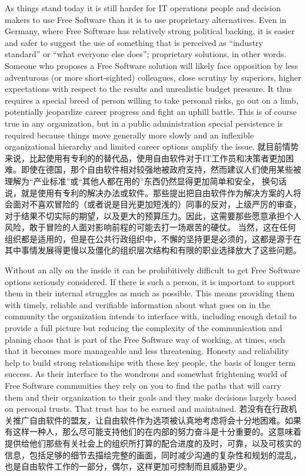 As things stand today it is still harder for IT operations people and decision
makers to use Free Software than it is to use proprietary alternatives. Even in
Germany, where Free Software has relatively strong political backing, it is
easier and safer to suggest the use of something that is perceived as ``industry
standard'' or ``what everyone else does''; proprietary solutions, in other words.
Someone who proposes a Free Software solution will likely face opposition by
less adventurous (or more short-sighted) colleagues, close scrutiny by
superiors, higher expectations with respect to the results and unrealistic
budget pressure. It thus requires a special breed of person willing to take
personal risks, go out on a limb, potentially jeopardize career progress and
fight an uphill battle. This is of course true in any organization, but in a
public administration special persistence is required because things move
generally more slowly and an inflexible organizational hierarchy and limited
career options amplify the issue.
就目前情势来说，比起使用有专利的的替代品，使用自由软件对于IT工作员和决策者更加困难。即使在德国，那个自由软件相对较强地被政府支持，然而建议人们使用某些被理解为“产业标准”或“其他人都在用的”东西仍然显得更加简单和安全，
换句话说，就是使用有专利的解决办法或软件。那些提出把自由软件作为解决方案的人将会面对不喜欢冒险的（或者说是目光更加短浅的）同事的反对，上级严厉的审查，对于结果不切实际的期望，以及更大的预算压力。因此，这需要那些愿意承担个人风险，敢于冒险的人面对影响前程的可能去打一场艰苦的硬仗。
当然，这在任何组织都是适用的，但是在公共行政组织中，不懈的坚持更是必须的，这都是源于在其中事情发展得更慢以及僵化的组织层次结构和有限的职业选择放大了这些问题。

Without an ally on the inside it can be prohibitively difficult to get
Free Software options seriously considered. If there is such a person, it is important
to support them in their internal struggles as much as possible. This
means providing them with timely, reliable and verifiable information about
what goes on in the community the organization intends to interface with,
including enough detail to provide a full picture but reducing the
complexity of the communication and planing chaos that is part of the Free
Software way of working, at times, such that it becomes more manageable and
less threatening. Honesty and reliability help to build strong
relationships with these key people, the basis of longer term success. As
their interface to the wondrous and somewhat frightening world of Free
Software communities they rely on you to find the paths that will carry
them and their organization to their goals and they make decisions largely
based on personal trusts. That trust has to be earned and maintained.
若没有在行政机关推广自由软件的盟友，让自由软件作为选项被认真地考虑将会十分地困难。如果有这样一种人，那么尽可能支持他们的在内部的努力奋斗是十分重要的。这意味着提供给他们那些有关社会上的组织所打算的配合进度的及时，可靠，以及可核实的信息，包括足够的细节去描绘完整的画面，同时减少沟通的复杂性和规划的混乱，也是自由软件工作的一部分，偶尔，这样更加可控制而且威胁更少。

